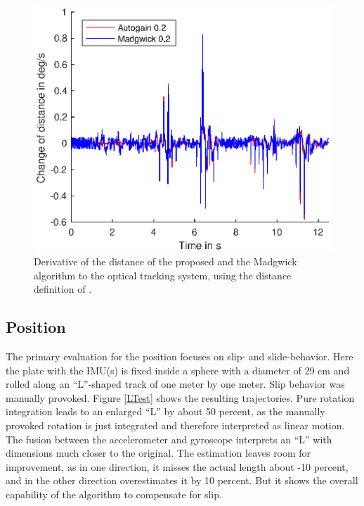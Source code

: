 \documentclass[letterpaper, 10 pt, conference]{ieeeconf}  %
\begin{document}
\begin{figure}
\includegraphics[width=\linewidth]{./graphics/diffdistance.eps}
\caption{Derivative of the distance of the proposed and the Madgwick algorithm to the optical tracking system, using the distance definition of \cite{kuffner2004effectiveDistance}.}
\label{diffdistance}
\end{figure}


\subsection{Position}
The primary evaluation for the position focuses on slip- and slide-behavior.
Here the plate with the IMU(s) is fixed inside a sphere with a diameter of 29 cm and rolled along an ``L''-shaped track of one meter by one meter.
Slip behavior was manually provoked.
Figure \ref{LTest} shows the resulting trajectories.
Pure rotation integration leads to an enlarged ``L'' by about 50 percent, as the manually provoked rotation is just integrated and therefore interpreted as linear motion.
The fusion between the accelerometer and gyroscope interprets an ``L'' with dimensions much closer to the original.
The estimation leaves room for improvement, as in one direction, it misses the actual length about -10 percent, and in the other direction overestimates it by 10 percent.
But it shows the overall capability of the algorithm to compensate for slip. 
\end{document}
